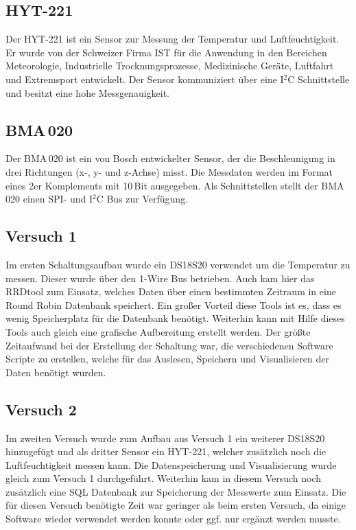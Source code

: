 \subsection*{HYT-221}
\label{subsection_HYT221}
Der HYT-221 ist ein Sensor zur Messung der Temperatur und Luftfeuchtigkeit. Er wurde von der Schweizer Firma IST für die Anwendung in den Bereichen Meteorologie, Industrielle Trocknungsprozesse, Medizinische Geräte, Luftfahrt und Extremsport entwickelt. Der Sensor kommuniziert über eine I$^2$C Schnittstelle und besitzt eine hohe Messgenauigkeit. 

\subsection*{BMA\,020}
\label{subsection_BMA020}
Der BMA\,020 ist ein von Bosch entwickelter Sensor, der die Beschleunigung in drei Richtungen (x-, y- und z-Achse) misst. Die Messdaten werden im Format eines 2er Komplements mit 10\,Bit ausgegeben. Als Schnittstellen stellt der BMA\,020 einen SPI- und I$^2$C Bus zur Verfügung.  

\subsection{Versuch 1}
Im ersten Schaltungsaufbau wurde ein DS18S20 verwendet um die Temperatur zu messen. Dieser wurde über den 1-Wire Bus betrieben. Auch kam hier das RRDtool zum Einsatz, welches Daten über einen bestimmten Zeitraum in eine Round Robin Datenbank speichert. Ein großer Vorteil diese Tools ist es, dass es wenig Speicherplatz für die Datenbank benötigt. Weiterhin kann mit Hilfe dieses Tools auch gleich eine grafische Aufbereitung erstellt werden. Der größte Zeitaufwand bei der Erstellung der Schaltung war, die verschiedenen Software Scripte zu erstellen, welche für das Auslesen, Speichern und Visualisieren der Daten benötigt wurden.

\subsection{Versuch 2}
Im zweiten Versuch wurde zum Aufbau aus Versuch 1 ein weiterer DS18S20 hinzugefügt und als dritter Sensor ein HYT-221, welcher zusätzlich noch die Luftfeuchtigkeit messen kann. Die Datenspeicherung und Visualisierung wurde gleich zum Versuch 1 durchgeführt. Weiterhin kam in diesem Versuch noch zusätzlich eine SQL Datenbank zur Speicherung der Messwerte zum Einsatz. Die für diesen Versuch benötigte Zeit war geringer als beim ersten Versuch, da einige Software wieder verwendet werden konnte oder ggf. nur ergänzt werden musste.

